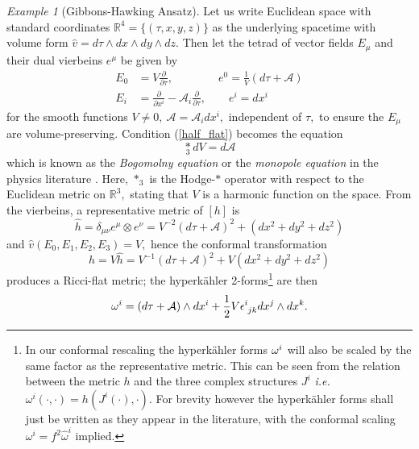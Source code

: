 \documentclass[a4paper,12pt, onecolumn, notitlepage]{article}
\theoremstyle{definition}
\theoremstyle{remark}
\newtheorem{ex}[thm]{Example}
\newcommand{\ie}{\emph{i.e.} }
\newcommand{\w}{\omega}
\newcommand{\m}{\mu}
\newcommand{\n}{\nu}
\newcommand{\e}{\epsilon}
\newcommand{\ddt}[1]{\frac{\partial #1}{\partial \tau}}
\newcommand{\dd}[2]{\frac{\partial #1}{\partial #2}}
\newcommand{\HK}{hyperk\"ahler }
\newcommand{\x}[1]{x^{#1}}
\newcommand{\R}{\mathbb{R}}
\begin{document}
\begin{ex}[Gibbons-Hawking Ansatz]
	Let us write Euclidean space with standard coordinates $\R^{4} = \{(\tau,x,y,z)\}$ as the underlying spacetime with volume form $\hat{v}=d\tau\wedge dx\wedge dy\wedge dz.$ Then let the tetrad of vector fields $E_{\m}$ and their dual vierbeins $e^{\m}$ be given by
	\begin{align*}
	\label{gh_vectors}
		E_{0} &= V\dd{}{\tau},\qquad\qquad e^{0} = \frac{1}{V}(d\tau+\mathcal{A})\\
		E_{i} &= \dd{}{\x{i}} - \mathcal{A}_{i}\ddt{},\qquad e^{i} = dx^{i}
	\end{align*}
	for the smooth functions $V\neq0,\ \mathcal{A} = \mathcal{A}_{i}dx^{i},$ independent of $\tau,$ to  ensure the $E_{\m}$ are volume-preserving. Condition (\ref{half_flat}) becomes the equation
	\begin{equation}
	\label{monopole}
		\underset{3}\ast dV = d\mathcal{A}
	\end{equation}
	which is known as the
	\emph{Bogomolny equation} or the \emph{monopole equation} in the physics literature \cite{solitons}. Here, $\ast_{3}$ is the Hodge-$\ast$ operator with respect to the Euclidean metric on $\R^{3},$ stating that $V$ is a harmonic function on the space. From the vierbeins, a representative metric of $[h]$ is
	\begin{equation*}
		\hat{h}=\delta_{\m\n}e^{\m}\otimes e^{\n} = V^{-2}(d\tau + \mathcal{A})^{2} + (dx^{2} + dy^{2} + dz^{2})
	\end{equation*}
	and $\hat{v}(E_{0},E_{1},E_{2},E_{3})=V,$ hence the conformal transformation
	\begin{equation}
		\label{gh_metric}
		h = V\hat{h} =  V^{-1}(d\tau + \mathcal{A})^{2} + V(dx^{2} + dy^{2} + dz^{2})
	\end{equation}
	produces a Ricci-flat metric; 
	the \HK 2-forms\footnote{In our conformal rescaling the \HK forms $\w\indices{^i}$ will also be scaled by the same factor as the representative metric. This can be seen from the relation between the metric $h$ and the three complex structures $J^{i}$ \ie $\w^{i}(\cdot,\cdot) = h(J^{i}(\cdot),\cdot).$ For brevity however the \HK forms shall just be written as they appear in the literature, with the conformal scaling $\w^{i} = f^{2}\hat{\w}^{i}$ implied.} are then
	\begin{equation}
	\label{gh_forms}
		\w\indices{^i} = (d\tau + \mathcal{A})\wedge dx\indices{^i} + \frac{1}{2}V\e\indices{^i_j_k}dx\indices{^j}\wedge dx\indices{^k}.
	\end{equation}

\end{ex}
\end{document}
